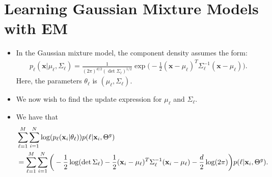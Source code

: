 \documentclass[10pt]{article}
\newcommand{\ve}[1]{\mathbf{#1}}
\newcommand{\x}{\mathbf{x}}
\begin{document}
  \section{Learning Gaussian Mixture Models with EM}
  
  \begin{itemize}
    \item In the Gaussian mixture model, the component density assumes the form:
    \begin{align*}
      p_\ell(\ve{x} |\mu_\ell, \Sigma_\ell) = \frac{1}{(2\pi)^{d/2}(\det \Sigma_\ell)^{1/2}} \exp\bigg( -\frac{1}{2} (\x - \mu_\ell)^T \Sigma_\ell^{-1} (\x - \mu_\ell) \bigg).
    \end{align*}
    Here, the parameters $\theta_\ell$ is $(\mu_\ell, \Sigma_\ell)$.
    
    \item We now wish to find the update expression for $\mu_\ell$ and $\Sigma_\ell$.
    
    \item We have that
    \begin{align} \label{gaussian-expectation}
      & \sum_{\ell=1}^M \sum_{i=1}^N  \log(p_{\ell}(\x_i|\theta_{\ell}))p(\ell|\x_i,\Theta^g) \notag\\
      &= \sum_{\ell=1}^M \sum_{i=1}^N \bigg( -\frac{1}{2} \log(\det \Sigma_\ell) - \frac{1}{2} (\x_i - \mu_\ell)^T \Sigma_\ell^{-1} (\x_i - \mu_\ell) - \frac{d}{2}\log(2\pi) \bigg)p(\ell|\x_i,\Theta^g).
    \end{align}
    

\end{itemize}
\end{document}

